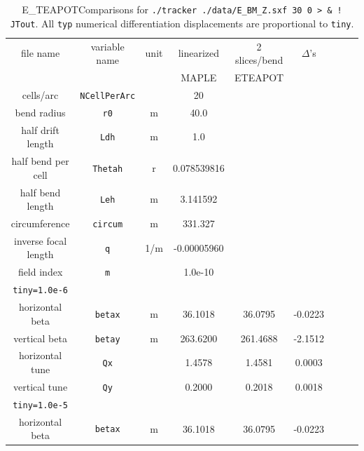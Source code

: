 \documentclass[12pt]{article}
\begin{document}
%
\begin{table}[h]\small
\caption{\label{tbl:benchmarkParams.Z}E\_TEAPOTComparisons for
{\tt ./tracker ./data/E\_BM\_Z.sxf 30 0 > \& ! JTout}.
All {\tt typ} numerical differentiation displacements are proportional to {\tt tiny}.
}
\medskip
\centering
\begin{tabular}{|c|c|c|c|c|c|c|c|c|}           \hline
file name         & variable name     & unit  &  linearized  & 2 slices/bend  & $\Delta$'s \\
                  &                   &       &    MAPLE     &  ETEAPOT       &            \\ \hline
cells/arc         & {\tt NCellPerArc} &       &       20     &                &     \\
bend radius       &  {\tt r0}         &  m    &      40.0    &                &     \\
half drift length &  {\tt Ldh}        &  m    &     1.0      &                &     \\
half bend per cell & {\tt Thetah}     &  r    &  0.078539816 &                &     \\
half bend length  & {\tt Leh}         &  m    &  3.141592    &                &     \\
circumference     & {\tt circum}      &  m    &   331.327    &                &     \\ 
inverse focal length &  {\tt q}       & 1/m   & -0.00005960  &                &     \\
field index       &  {\tt m}          &       &  1.0e-10     &                &     \\ \hline
  {\tt tiny=1.0e-6} &                 &       &              &                &     \\ \hline 
horizontal beta  & {\tt betax}       &  m    &  36.1018      &   36.0795      & -0.0223     \\ 
vertical beta     & {\tt betay}       &  m    &  263.6200    &  261.4688      & -2.1512 \\
horizontal tune  &  {\tt Qx}         &       &   1.4578      &    1.4581      &  0.0003 \\
vertical tune     &  {\tt Qy}         &       &   0.2000     &    0.2018      &  0.0018 \\ \hline           
  {\tt tiny=1.0e-5} &                 &       &              &                &      \\ \hline 
horizontal beta  & {\tt betax}       &  m    &  36.1018      &    36.0795     &  -0.0223 \\ 

\end{tabular}
\end{table}
\end{document}
